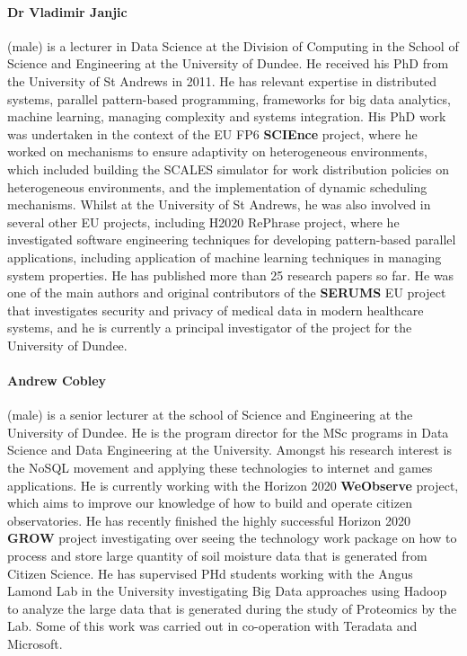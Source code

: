 \documentclass[a4paper,11pt]{article}
\begin{document}
\paragraph{Dr Vladimir Janjic} (male) is a lecturer in Data Science at the Division of Computing in the School of Science and Engineering at the University of Dundee. He received his PhD from the University of St Andrews in 2011. He has relevant expertise in distributed systems, parallel pattern-based programming, frameworks for big data analytics, machine learning, managing complexity and systems integration. His PhD work was undertaken in the context of the EU FP6 \textbf{SCIEnce} project, where he worked on mechanisms to ensure adaptivity on heterogeneous environments, which included building the SCALES simulator for work distribution policies on heterogeneous environments, and the implementation of dynamic scheduling mechanisms. Whilst at the University of St Andrews, he was also involved in several other EU projects, including H2020 RePhrase project, where he investigated software engineering techniques for developing pattern-based parallel applications, including application of machine learning techniques in managing system properties. He has published more than 25 research papers so far. He was one of the main authors and original contributors of the \textbf{SERUMS} EU project that investigates security and privacy of medical data in modern healthcare systems, and he is currently a principal investigator of the project for the University of Dundee.

\paragraph{Andrew Cobley} (male) is a senior lecturer at the school of Science and Engineering at the University of Dundee.    He is the program director for the MSc programs in Data Science and Data Engineering at the University.   Amongst his research interest is the NoSQL movement and applying these technologies to internet and games applications. He is currently working with the Horizon 2020 \textbf{WeObserve} project, which aims to improve our knowledge of how to build and operate citizen observatories. He has recently finished the highly successful Horizon 2020 \textbf{GROW} project investigating over seeing the technology work package on how to process and store large quantity of  soil moisture data  that is generated from Citizen Science.  He has supervised PHd students working with the Angus Lamond Lab in the University investigating Big Data approaches using Hadoop to analyze the large data that is generated during the study of Proteomics by the Lab.  Some of this work was carried out in co-operation with Teradata and Microsoft.
\end{document}
